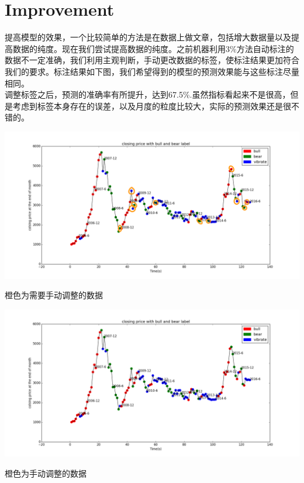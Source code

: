 \documentclass[10pt,a4paper]{article}
\begin{document}
\section{Improvement }
提高模型的效果，一个比较简单的方法是在数据上做文章，包括增大数据量以及提高数据的纯度。现在我们尝试提高数据的纯度。之前机器利用3\%方法自动标注的数据不一定准确，我们利用主观判断，手动更改数据的标签，使标注结果更加符合我们的要求。标注结果如下图，我们希望得到的模型的预测效果能与这些标注尽量相同。\\
调整标签之后，预测的准确率有所提升，达到67.5\%.虽然指标看起来不是很高，但是考虑到标签本身存在的误差，以及月度的粒度比较大，实际的预测效果还是很不错的。
\begin{center}
	\includegraphics[width=1\textwidth]{需要调整的标签.png}
	\caption{橙色为需要手动调整的数据}
\end{center}
\begin{center}
	\includegraphics[width=1\textwidth]{调整后的标签.png}
	\caption{橙色为手动调整的数据}
\end{center}
\end{document}
